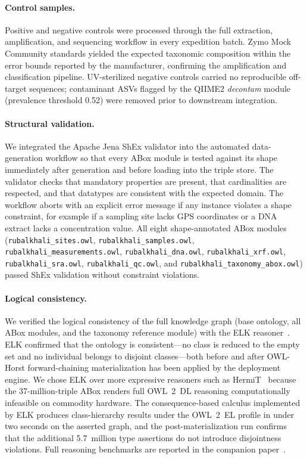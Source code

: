 \documentclass[11pt,a4paper]{article}
\begin{document}
\paragraph{Control samples.}
Positive and negative controls were processed through the full
extraction, amplification, and sequencing workflow in every
expedition batch. Zymo Mock Community standards yielded the expected
taxonomic composition within the error bounds reported by the
manufacturer, confirming the amplification and classification
pipeline. UV-sterilized negative controls carried no reproducible
off-target sequences; contaminant ASVs flagged by the QIIME2
\textit{decontam} module (prevalence threshold 0.52) were removed
prior to downstream integration.

\paragraph{Structural validation.}
We integrated the Apache Jena ShEx validator into the automated
data-generation workflow so that every ABox module is tested against
its shape immediately after generation and before loading into the
triple store. The validator checks that mandatory properties are
present, that cardinalities are respected, and that datatypes are
consistent with the expected domain. The workflow aborts with an
explicit error message if any instance violates a shape constraint,
for example if a sampling site lacks GPS coordinates or a DNA extract
lacks a concentration value. All eight shape-annotated ABox modules
(\texttt{rubalkhali\_sites.owl}, \texttt{rubalkhali\_samples.owl},
\texttt{rubalkhali\_measurements.owl}, \texttt{rubalkhali\_dna.owl},
\texttt{rubalkhali\_xrf.owl}, \texttt{rubalkhali\_sra.owl},
\texttt{rubalkhali\_qc.owl}, and \texttt{rubalkhali\_taxonomy\_abox.owl})
passed ShEx validation without constraint violations.

\paragraph{Logical consistency.}
We verified the logical consistency of the full knowledge graph
(base ontology, all ABox modules, and the taxonomy reference module)
with the ELK reasoner~\cite{elk}. ELK confirmed that the ontology is
consistent---no class is reduced to the empty set and no individual
belongs to disjoint classes---both before and after OWL-Horst
forward-chaining materialization has been applied by the deployment
engine. We chose ELK over more expressive reasoners such as
HermiT~\cite{hermit} because the 37-million-triple ABox renders
full OWL~2~DL reasoning computationally infeasible on commodity
hardware. The consequence-based calculus implemented by ELK produces
class-hierarchy results under the OWL~2~EL profile in under two
seconds on the asserted graph, and the post-materialization run
confirms that the additional 5.7~million type assertions do not
introduce disjointness violations. Full reasoning benchmarks are
reported in the companion paper~\cite{swj_companion}.
\end{document}
